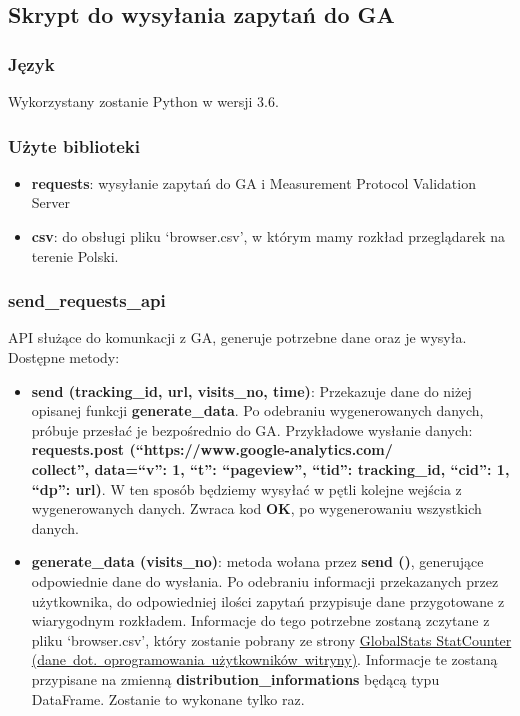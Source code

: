 \documentclass{article}
\begin{document}
\subsection{Skrypt do wysyłania zapytań do GA}

\subsubsection{Język}

Wykorzystany zostanie Python w wersji 3.6.

\subsubsection{Użyte biblioteki}

\begin{itemize}
\item \textbf{requests}: wysyłanie zapytań do GA i Measurement Protocol Validation Server
\item \textbf{csv}: do obsługi pliku `browser.csv', w którym mamy rozkład przeglądarek na terenie Polski.
\end{itemize}

\subsubsection{send\_requests\_api}
API służące do komunkacji z GA, generuje potrzebne dane oraz je wysyła.
Dostępne metody:
\begin{itemize}
\item \textbf{send (tracking\_id, url, visits\_no, time)}: Przekazuje dane do niżej opisanej funkcji \textbf{generate\_data}. Po odebraniu wygenerowanych danych, próbuje przesłać je bezpośrednio do GA\@. Przykładowe wysłanie danych: \textbf{requests.post (``https://www.google-analytics.com/\\collect'', data={``v'':  1, ``t'': ``pageview'', ``tid'': tracking\_id, ``cid'': 1, ``dp'': url})}. W ten sposób będziemy wysyłać w pętli kolejne wejścia z wygenerowanych danych. Zwraca kod \textbf{OK}, po wygenerowaniu wszystkich danych.

\item \textbf{generate\_data (visits\_no)}: metoda wołana przez \textbf{send ()}, generujące odpowiednie dane do wysłania. Po odebraniu informacji przekazanych przez użytkownika, do odpowiedniej ilości zapytań przypisuje dane przygotowane z wiarygodnym rozkładem. Informacje do tego potrzebne zostaną zczytane z pliku `browser.csv', który zostanie pobrany ze strony \href{http://gs.statcounter.com/browser-version-market-share/all/poland#monthly-201703-201803-bar}{GlobalStats StatCounter (dane\ dot.\ oprogramowania\ użytkowników\ witryny)}. Informacje te zostaną przypisane na zmienną \textbf{distribution\_informations} będącą typu DataFrame. Zostanie to wykonane tylko raz.
\end{itemize}
\end{document}

